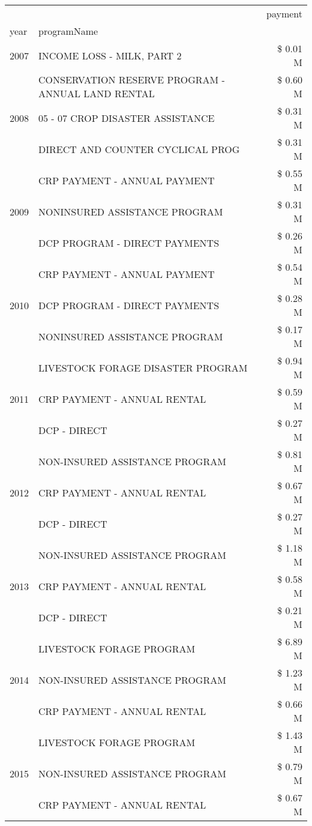 \begin{tabular}{llr}
\toprule
 &  & payment \\
year & programName &  \\
\midrule
2007 & INCOME LOSS - MILK, PART 2 & \$ 0.01 M \\
\cline{1-3}
\multirow[t]{3}{*}{2008} & CONSERVATION RESERVE PROGRAM - ANNUAL LAND RENTAL & \$ 0.60 M \\
 & 05 - 07 CROP DISASTER ASSISTANCE & \$ 0.31 M \\
 & DIRECT AND COUNTER CYCLICAL PROG & \$ 0.31 M \\
\cline{1-3}
\multirow[t]{3}{*}{2009} & CRP PAYMENT - ANNUAL PAYMENT & \$ 0.55 M \\
 & NONINSURED ASSISTANCE PROGRAM & \$ 0.31 M \\
 & DCP PROGRAM - DIRECT PAYMENTS & \$ 0.26 M \\
\cline{1-3}
\multirow[t]{3}{*}{2010} & CRP PAYMENT - ANNUAL PAYMENT & \$ 0.54 M \\
 & DCP PROGRAM - DIRECT PAYMENTS & \$ 0.28 M \\
 & NONINSURED ASSISTANCE PROGRAM & \$ 0.17 M \\
\cline{1-3}
\multirow[t]{3}{*}{2011} & LIVESTOCK FORAGE DISASTER PROGRAM & \$ 0.94 M \\
 & CRP PAYMENT - ANNUAL RENTAL & \$ 0.59 M \\
 & DCP - DIRECT & \$ 0.27 M \\
\cline{1-3}
\multirow[t]{3}{*}{2012} & NON-INSURED ASSISTANCE PROGRAM & \$ 0.81 M \\
 & CRP PAYMENT - ANNUAL RENTAL & \$ 0.67 M \\
 & DCP - DIRECT & \$ 0.27 M \\
\cline{1-3}
\multirow[t]{3}{*}{2013} & NON-INSURED ASSISTANCE PROGRAM & \$ 1.18 M \\
 & CRP PAYMENT - ANNUAL RENTAL & \$ 0.58 M \\
 & DCP - DIRECT & \$ 0.21 M \\
\cline{1-3}
\multirow[t]{3}{*}{2014} & LIVESTOCK FORAGE PROGRAM & \$ 6.89 M \\
 & NON-INSURED ASSISTANCE PROGRAM & \$ 1.23 M \\
 & CRP PAYMENT - ANNUAL RENTAL & \$ 0.66 M \\
\cline{1-3}
\multirow[t]{3}{*}{2015} & LIVESTOCK FORAGE PROGRAM & \$ 1.43 M \\
 & NON-INSURED ASSISTANCE PROGRAM & \$ 0.79 M \\
 & CRP PAYMENT - ANNUAL RENTAL & \$ 0.67 M \\

\end{tabular}
